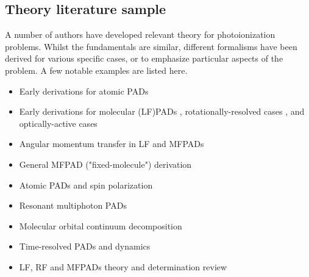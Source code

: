 \subsection{Theory literature sample\label{sec:theory-lit}}

A number of authors have developed relevant theory for photoionization problems. Whilst the fundamentals are similar, different formalisms have been derived for various specific cases, or to emphasize particular aspects of the problem. A few notable examples are listed here.

\begin{itemize}
\item Early derivations for atomic PADs \cite{Cherepkov1979,Cooper1968,Cooper1969}
\item Early derivations for molecular (LF)PADs \cite{Tully1968}, rotationally-resolved cases \cite{Buckingham1970}, and optically-active cases \cite{Ritchie1976}
\item Angular momentum transfer in LF and MFPADs \cite{Fano1972} 
\item General MFPAD ("fixed-molecule") derivation \cite{Dill1976}
\item Atomic PADs and spin polarization \cite{Klar1982}
\item Resonant multiphoton PADs \cite{Dixit1983}
\item Molecular orbital continuum decomposition \cite{Park1996}
\item Time-resolved PADs and dynamics \cite{Underwood2000,Seideman2001,Stolow2008}
\item LF, RF and MFPADs theory and determination review \cite{dowek2012PhotoionizationDynamicsPhotoemission}
\end{itemize}